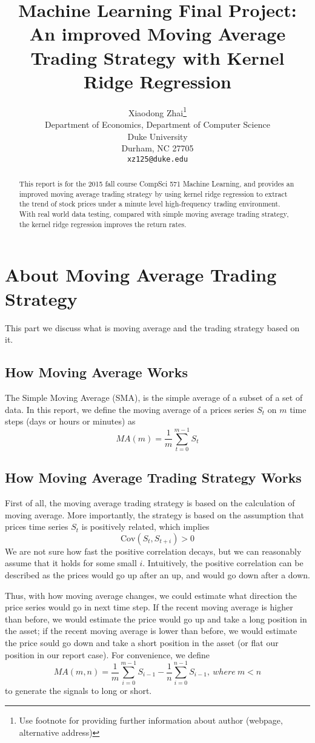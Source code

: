 \documentclass{article} %
\title{Machine Learning Final Project: \\An improved Moving Average Trading Strategy with Kernel Ridge Regression}
\author{
Xiaodong Zhai\thanks{ Use footnote for providing further information
about author (webpage, alternative address)} \\
Department of Economics, Department of Computer Science\\
Duke University\\
Durham, NC 27705\\
\texttt{xz125@duke.edu}
}
\begin{document}
\maketitle

\begin{abstract}
This report is for the 2015 fall course CompSci 571 Machine Learning, and provides an improved moving average trading strategy by using kernel ridge regression to extract the trend of stock prices under a minute level high-frequency trading environment. With real world data testing, compared with simple moving average trading strategy, the kernel ridge regression improves the return rates.
\end{abstract}

\section{About Moving Average Trading Strategy}

This part we discuss what is moving average and the trading strategy based on it.

\subsection{How Moving Average Works}
The Simple Moving Average (SMA), is the simple average of a subset of a set of data. In this report, we define the moving average of a prices series ${S_t}$ on $m$ time steps (days or hours or minutes) as 
\[
\mathit{MA}(m) = \frac{1}{m} \sum^{m-1}_{t=0} S_t
\]

\subsection{How Moving Average Trading Strategy Works}
First of all, the moving average trading strategy is based on the calculation of moving average. More importantly, the strategy is based on the assumption that prices time series ${S_t}$ is positively related, which implies
\[
\mathrm{Cov}(S_t, S_{t+i}) > 0
\]
We are not sure how fast the positive correlation decays, but we can reasonably assume that it holds for some small $i$. Intuitively, the positive correlation can be described as the prices would go up after an up, and would go down after a down.

Thus, with how moving average changes, we could estimate what direction the price series would go in next time step. If the recent moving average is higher than before, we would estimate the price would go up and take a long position in the asset; if the recent moving average is lower than before, we would estimate the price sould go down and take a short position in the asset (or flat our position in our report case). For convenience, we define
\[
\mathit{MA}(m, n) =\frac{1}{m}\sum^{m-1}_{i=0}S_{i-1} - \frac{1}{n}\sum^{n-1}_{i=0}S_{i-1}, \ \mathit{where} \ m < n
\]
to generate the signals to long or short.
\end{document}
